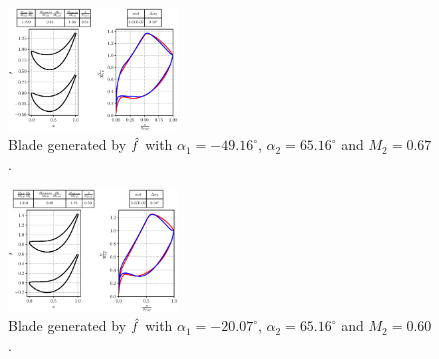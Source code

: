 \documentclass[11pt,a4paper,twocolumn]{article}
\newcommand\widthPCA{0.4}
\begin{document}
\begin{figure}[!h]
    \centering 
    \includegraphics[width=\widthPCA\textwidth]{./images/blade--4916-6516-67.eps}
    \caption{Blade generated by $\hat{\mathnormal{f}}$ with $\alpha_1 = -49.16^{\circ}$, $\alpha_2 = 65.16^{\circ}$ and $M_2 = 0.67$.}
    \label{fig:bladeML3}
\end{figure}

\begin{figure}[!h]
    \centering 
    \includegraphics[width=\widthPCA\textwidth]{./images/blade--2007-6516-60.eps}
    \caption{Blade generated by $\hat{\mathnormal{f}}$ with $\alpha_1 = -20.07^{\circ}$, $\alpha_2 = 65.16^{\circ}$ and $M_2 = 0.60$.}
    \label{fig:bladeML4}
\end{figure}
\end{document}
